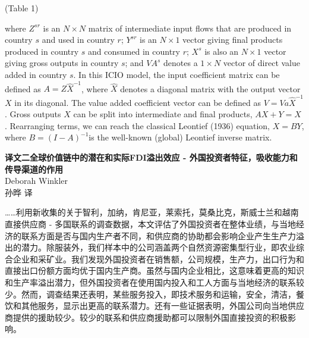 \documentclass[12pt]{ctexart}
\begin{document}
\begin{appendix}
\begin{center}
(Table 1)
\end{center}

where $Z^{sr}$ is an $N×N$ matrix of intermediate input flows that are produced in country $s$ and used in country $r$; $Y^{sr}$ is an $N×1$ vector giving final products produced in country $s$ and consumed in country $r$; $X^s$ is also an $N×1$ vector giving gross outputs in country $s$; and $VA^s$ denotes a $1×N$ vector of direct value added in country $s$. In this ICIO model, the input coefficient matrix can be defined as $A = Z\hat{X}^{-1}$, where $\hat{X}$ denotes a diagonal matrix with the output vector $X$ in its diagonal. The value added coefficient vector can be defined as $V = Va\hat{X}^{-1}$
. Gross outputs $X$ can be split into intermediate and final products, $AX + Y = X$
. Rearranging terms, we can reach the classical Leontief (1936) equation, $X = BY$,
where $B = (I-A)^{-1}$is the well-known (global) Leontief inverse matrix.
\newpage
\begin{center}
\vspace{3ex}
\textbf{译文二}\quad\textbf{全球价值链中的潜在和实际FDI溢出效应 - 外国投资者特征，吸收能力和传导渠道的作用}\\
\vspace{1.5ex}
Deborah Winkler\\
\vspace{1.5ex}
孙晔 \quad 译\\
\vspace{1.5ex}
\end{center}
……利用新收集的关于智利，加纳，肯尼亚，莱索托，莫桑比克，斯威士兰和越南直接供应商 - 多国联系的调查数据，本文评估了外国投资者在整体业绩，与当地经济的联系方面是否与国内生产者不同，和供应商的协助都会影响企业产生生产力溢出的潜力。除服装外，我们样本中的公司涵盖两个自然资源密集型行业，即农业综合企业和采矿业。我们发现外国投资者在销售额，公司规模，生产力，出口行为和直接出口份额方面均优于国内生产商。虽然与国内企业相比，这意味着更高的知识和生产率溢出潜力，但外国投资者在使用国内投入和工人方面与当地经济的联系较少。然而，调查结果还表明，某些服务投入，即技术服务和运输，安全，清洁，餐饮和其他服务，显示出更高的联系潜力。还有一些证据表明，外国公司向当地供应商提供的援助较少。较少的联系和供应商援助都可以限制外国直接投资的积极影响。

\newpage

\end{appendix}
\end{document}
